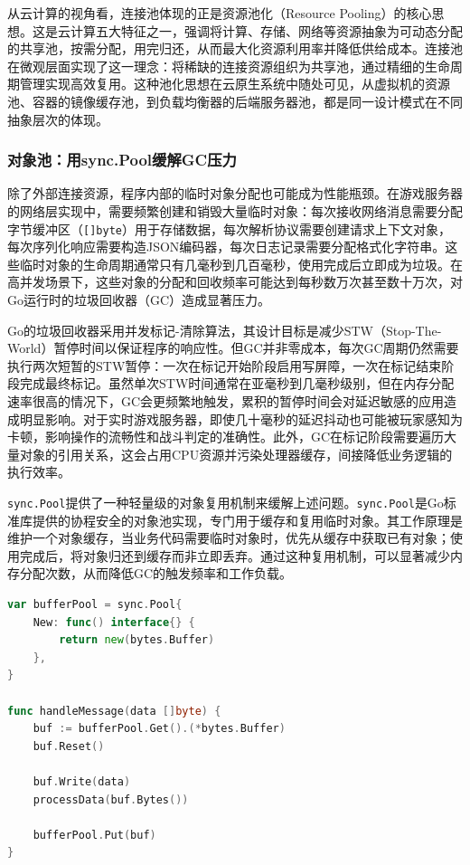 从云计算的视角看，连接池体现的正是资源池化（Resource Pooling）的核心思想。这是云计算五大特征之一，强调将计算、存储、网络等资源抽象为可动态分配的共享池，按需分配，用完归还，从而最大化资源利用率并降低供给成本。连接池在微观层面实现了这一理念：将稀缺的连接资源组织为共享池，通过精细的生命周期管理实现高效复用。这种池化思想在云原生系统中随处可见，从虚拟机的资源池、容器的镜像缓存池，到负载均衡器的后端服务器池，都是同一设计模式在不同抽象层次的体现。

\subsubsection{对象池：用sync.Pool缓解GC压力}

除了外部连接资源，程序内部的临时对象分配也可能成为性能瓶颈。在游戏服务器的网络层实现中，需要频繁创建和销毁大量临时对象：每次接收网络消息需要分配字节缓冲区（\texttt{[]byte}）用于存储数据，每次解析协议需要创建请求上下文对象，每次序列化响应需要构造JSON编码器，每次日志记录需要分配格式化字符串。这些临时对象的生命周期通常只有几毫秒到几百毫秒，使用完成后立即成为垃圾。在高并发场景下，这些对象的分配和回收频率可能达到每秒数万次甚至数十万次，对Go运行时的垃圾回收器（GC）造成显著压力。

Go的垃圾回收器采用并发标记-清除算法，其设计目标是减少STW（Stop-The-World）暂停时间以保证程序的响应性。但GC并非零成本，每次GC周期仍然需要执行两次短暂的STW暂停：一次在标记开始阶段启用写屏障，一次在标记结束阶段完成最终标记。虽然单次STW时间通常在亚毫秒到几毫秒级别，但在内存分配速率很高的情况下，GC会更频繁地触发，累积的暂停时间会对延迟敏感的应用造成明显影响。对于实时游戏服务器，即使几十毫秒的延迟抖动也可能被玩家感知为卡顿，影响操作的流畅性和战斗判定的准确性。此外，GC在标记阶段需要遍历大量对象的引用关系，这会占用CPU资源并污染处理器缓存，间接降低业务逻辑的执行效率。

\texttt{sync.Pool}提供了一种轻量级的对象复用机制来缓解上述问题。\texttt{sync.Pool}是Go标准库提供的协程安全的对象池实现，专门用于缓存和复用临时对象。其工作原理是维护一个对象缓存，当业务代码需要临时对象时，优先从缓存中获取已有对象；使用完成后，将对象归还到缓存而非立即丢弃。通过这种复用机制，可以显著减少内存分配次数，从而降低GC的触发频率和工作负载。

\begin{tcolorbox}[title=使用sync.Pool复用临时对象]
\begin{lstlisting}[style=codeblock, language=go]
var bufferPool = sync.Pool{
    New: func() interface{} {
        return new(bytes.Buffer)
    },
}

func handleMessage(data []byte) {
    buf := bufferPool.Get().(*bytes.Buffer)
    buf.Reset()
    
    buf.Write(data)
    processData(buf.Bytes())
    
    bufferPool.Put(buf)
}
\end{lstlisting}
\end{tcolorbox}

